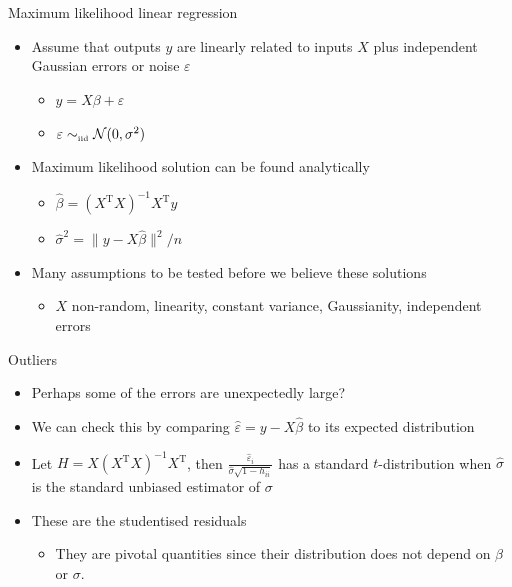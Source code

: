 \begin{frame}{Maximum likelihood linear regression}
  \begin{itemize}
    \item Assume that outputs $y$ are linearly related to inputs $X$ plus independent Gaussian errors or noise $\varepsilon$
    \begin{itemize}
      \item $y = X\beta + \varepsilon$
      \item $\varepsilon \sim_{\mbox{\tiny iid}} \mathcal{N}(0, \sigma^2)$
    \end{itemize}
    \pause
    \vspace{\baselineskip}
    \item Maximum likelihood solution can be found analytically
    \begin{itemize}
      \item $\hat\beta = (X^{\textrm{T}}X)^{-1}X^{\textrm{T}}y$
      \item $\hat\sigma^2 = \|y - X \hat\beta\|^2 / n$
    \end{itemize}
    \pause
    \vspace{\baselineskip}
    \item Many assumptions to be tested before we believe these solutions
    \begin{itemize}
      \item \eg $X$ non-random, linearity, constant variance, Gaussianity, independent errors
    \end{itemize}
  \end{itemize}
\end{frame}

\begin{frame}{Outliers}
  \begin{itemize}
    \item Perhaps some of the errors are unexpectedly large?
    \pause
    \vspace{\baselineskip}
    \item We can check this by comparing $\hat\varepsilon = y - X\hat\beta$ to its expected distribution
    \pause
    \vspace{\baselineskip}
    \item Let $H = X(X^{\textrm{T}}X)^{-1}X^{\textrm{T}}$, then $\frac{\hat\varepsilon_i}{\hat\sigma\sqrt{1 - h_{ii}}}$ has a standard $t$-distribution when $\hat\sigma$ is the standard unbiased estimator of $\sigma$
    \pause
    \vspace{\baselineskip}
    \item These are the studentised residuals
    \begin{itemize}
      \item They are pivotal quantities since their distribution does not depend on $\beta$ or $\sigma$.
    \end{itemize}
  \end{itemize}
\end{frame}

